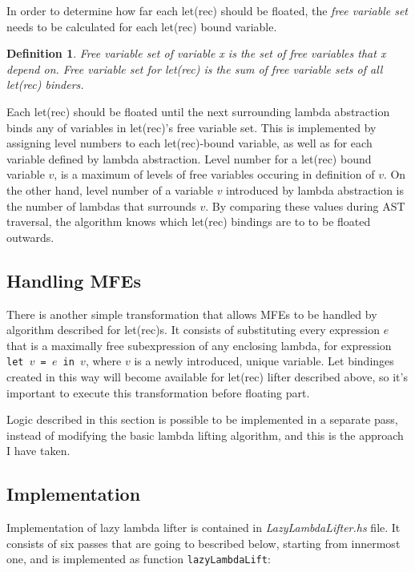 \documentclass[12pt,a4paper]{report}
\newtheorem{definition}{Definition}[chapter]
\begin{document}
In order to determine how far each let(rec) should be floated, the \textit{free
variable set} needs to be calculated for each let(rec) bound variable.

\begin{definition}
  Free variable set of variable x is the set of free variables
  that x depend on. Free variable set for let(rec) is the sum of free
  variable sets of all let(rec) binders.
\end{definition}

Each let(rec) should be floated until the next surrounding lambda abstraction
binds any of variables in let(rec)'s free variable set. This is implemented by
assigning level numbers to each let(rec)-bound variable, as well as for each
variable defined by lambda abstraction. Level number for a let(rec) bound
variable $v$, is a maximum of levels of free variables occuring in definition
of $v$. On the other hand, level number of a variable $v$ introduced by lambda
abstraction is the number of lambdas that surrounds $v$. By comparing these
values during AST traversal, the algorithm knows which let(rec) bindings are to
to be floated outwards.

\subsection{Handling MFEs}
There is another simple transformation that allows MFEs to be handled by
algorithm described for let(rec)s. It consists of substituting every expression
$e$ that is a maximally free subexpression of any enclosing lambda, for
expression \texttt{let $v$ = $e$ in $v$}, where $v$ is a newly introduced,
unique variable. Let bindinges created in this way will become available for
let(rec) lifter described above, so it's important to execute this
transformation before floating part.

Logic described in this section is possible to be implemented in a separate
pass, instead of modifying the basic lambda lifting algorithm, and this is the
approach I have taken.

\subsection{Implementation}
Implementation of lazy lambda lifter is contained in
\textit{LazyLambdaLifter.hs} file. It consists of six passes that are going to
bescribed below, starting from innermost one, and is implemented as function
\texttt{lazyLambdaLift}:
\end{document}
